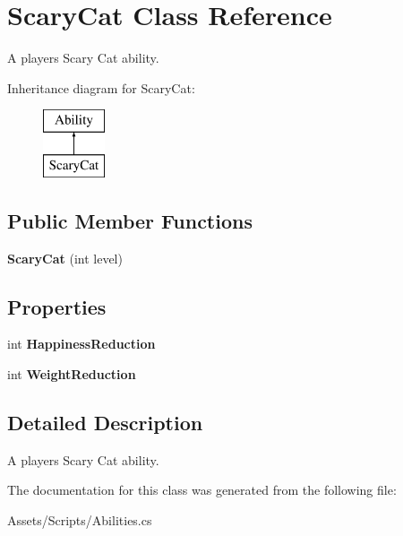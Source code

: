 \hypertarget{class_scary_cat}{}\section{Scary\+Cat Class Reference}
\label{class_scary_cat}


A player\textquotesingle{}s Scary Cat ability.  


Inheritance diagram for Scary\+Cat\+:\begin{figure}[H]
\begin{center}
\leavevmode
\includegraphics[height=2.000000cm]{class_scary_cat}
\end{center}
\end{figure}
\subsection*{Public Member Functions}
\begin{DoxyCompactItemize}
\item 
{\bfseries Scary\+Cat} (int level)\hypertarget{class_scary_cat_a78f35c5175a67080939452762912835a}{}\label{class_scary_cat_a78f35c5175a67080939452762912835a}

\end{DoxyCompactItemize}
\subsection*{Properties}
\begin{DoxyCompactItemize}
\item 
int {\bfseries Happiness\+Reduction}\hypertarget{class_scary_cat_abfd15aeb1a3bf66d53289f3ff48cd052}{}\label{class_scary_cat_abfd15aeb1a3bf66d53289f3ff48cd052}

\item 
int {\bfseries Weight\+Reduction}\hypertarget{class_scary_cat_a44a2db347230d52f598ef357674086fe}{}\label{class_scary_cat_a44a2db347230d52f598ef357674086fe}

\end{DoxyCompactItemize}


\subsection{Detailed Description}
A player\textquotesingle{}s Scary Cat ability. 



The documentation for this class was generated from the following file\+:\begin{DoxyCompactItemize}
\item 
Assets/\+Scripts/Abilities.\+cs\end{DoxyCompactItemize}
